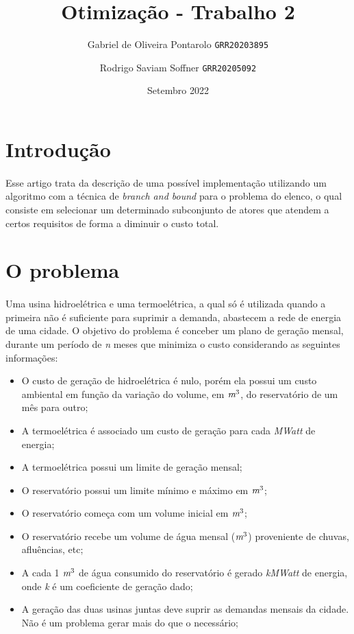 \documentclass{article}
\title{Otimização - Trabalho 2}
\author{
    Gabriel de Oliveira Pontarolo 
    \texttt{GRR20203895}
    \and 
    Rodrigo Saviam Soffner
    \texttt{GRR20205092}
}
\date{Setembro 2022}
\begin{document}
\maketitle

\section{Introdução}
\paragraph{} Esse artigo trata da descrição de uma possível implementação utilizando um algoritmo com a técnica de \emph{branch and bound} para o problema do elenco, o qual consiste em selecionar um determinado subconjunto de atores que atendem a certos requisitos de forma a diminuir o custo total. 

\section{O problema}
\paragraph{} Uma usina hidroelétrica e uma termoelétrica, a qual só é utilizada quando a primeira não é suficiente para suprimir a demanda, abastecem a rede de energia de uma cidade. O objetivo do problema é conceber um plano de geração mensal, durante um período de \emph{n} meses que minimiza o custo considerando as seguintes informações:

\begin{itemize}
    \item O custo de geração de hidroelétrica é nulo, porém ela possui um custo ambiental em função da variação do volume, em $\emph{m}^3$, do reservatório de um mês para outro;
    \item A termoelétrica é associado um custo de geração para cada \emph{MWatt} de energia;
    \item A termoelétrica possui um limite de geração mensal;
    \item O reservatório possui um limite mínimo e máximo em $\emph{m}^3$;
    \item O reservatório começa com um volume inicial em $\emph{m}^3$;
    \item O reservatório recebe um volume de água mensal ($\emph{m}^3$) proveniente de chuvas, afluências, etc;
    \item A cada 1 $\emph{m}^3$ de água consumido do reservatório é gerado \emph{kMWatt} de energia, onde \emph{k} é um coeficiente de geração dado;
    \item A geração das duas usinas juntas deve suprir as demandas mensais da cidade. Não é um problema gerar mais do que o necessário;
\end{itemize}
\end{document}
